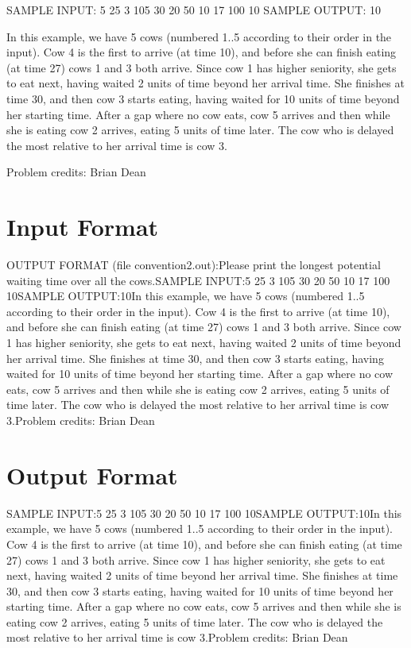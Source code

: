 \documentclass[12pt]{article}
\begin{document}
SAMPLE INPUT:
5
25 3
105 30
20 50
10 17
100 10
SAMPLE OUTPUT: 
10

In this example, we have 5 cows (numbered 1..5 according to their order in the
input). Cow 4 is the first to arrive (at time 10), and before she can finish
eating (at time 27) cows 1 and 3 both arrive.  Since cow 1 has higher seniority,
she gets to eat next, having waited 2 units of time beyond her arrival time. 
She finishes at time 30, and then cow 3 starts eating, having waited for 10
units of time beyond her starting time.  After a gap where no cow eats, cow 5
arrives and then while she is eating cow 2 arrives, eating 5 units of time
later.  The cow who is delayed the most relative to her arrival time is cow 3.


Problem credits: Brian Dean



\section*{Input Format}
OUTPUT FORMAT (file convention2.out):Please print the longest potential waiting time over all the cows.SAMPLE INPUT:5
25 3
105 30
20 50
10 17
100 10SAMPLE OUTPUT:10In this example, we have 5 cows (numbered 1..5 according to their order in the
input). Cow 4 is the first to arrive (at time 10), and before she can finish
eating (at time 27) cows 1 and 3 both arrive.  Since cow 1 has higher seniority,
she gets to eat next, having waited 2 units of time beyond her arrival time. 
She finishes at time 30, and then cow 3 starts eating, having waited for 10
units of time beyond her starting time.  After a gap where no cow eats, cow 5
arrives and then while she is eating cow 2 arrives, eating 5 units of time
later.  The cow who is delayed the most relative to her arrival time is cow 3.Problem credits: Brian Dean

\section*{Output Format}
SAMPLE INPUT:5
25 3
105 30
20 50
10 17
100 10SAMPLE OUTPUT:10In this example, we have 5 cows (numbered 1..5 according to their order in the
input). Cow 4 is the first to arrive (at time 10), and before she can finish
eating (at time 27) cows 1 and 3 both arrive.  Since cow 1 has higher seniority,
she gets to eat next, having waited 2 units of time beyond her arrival time. 
She finishes at time 30, and then cow 3 starts eating, having waited for 10
units of time beyond her starting time.  After a gap where no cow eats, cow 5
arrives and then while she is eating cow 2 arrives, eating 5 units of time
later.  The cow who is delayed the most relative to her arrival time is cow 3.Problem credits: Brian Dean
\end{document}

